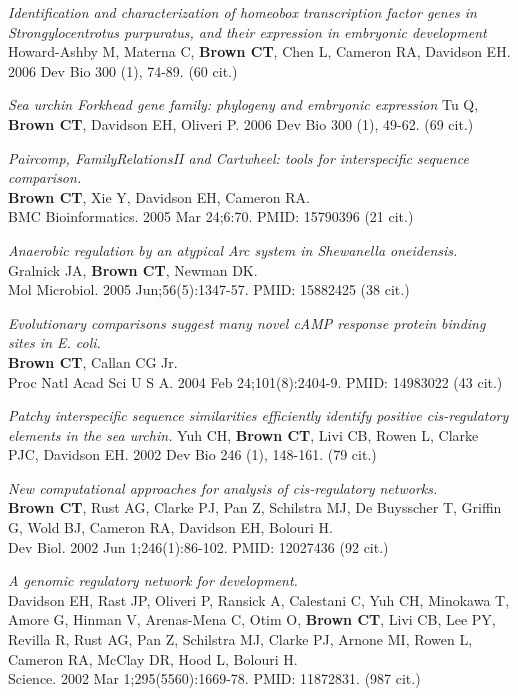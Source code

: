 \documentclass[margin,line]{resume}
\begin{document}
\begin{resume}
{\em Identification and characterization of homeobox transcription factor genes in Strongylocentrotus purpuratus, and their expression in embryonic development}
Howard-Ashby M, Materna C, {\bf Brown CT}, Chen L, Cameron RA, Davidson EH.
2006 Dev Bio 300 (1), 74-89.  (60 cit.)

{\em Sea urchin Forkhead gene family: phylogeny and embryonic expression}
Tu Q, {\bf Brown CT}, Davidson EH, Oliveri P.
2006 Dev Bio 300 (1), 49-62. (69 cit.)

{\em Paircomp, FamilyRelationsII and Cartwheel: tools for interspecific sequence comparison.}\\
{\bf Brown CT}, Xie Y, Davidson EH, Cameron RA.\\
BMC Bioinformatics. 2005 Mar 24;6:70.
PMID: 15790396 (21 cit.)

{\em Anaerobic regulation by an
atypical Arc system in {\em Shewanella oneidensis}.}\\
Gralnick JA, {\bf Brown CT}, Newman DK.\\
Mol Microbiol. 2005
Jun;56(5):1347-57.  PMID: 15882425 (38 cit.)

{\em Evolutionary comparisons suggest
many novel cAMP response protein binding sites in {\em E. coli}.}\\
{\bf Brown CT}, Callan CG Jr.\\
Proc Natl Acad Sci U S A. 2004 Feb 24;101(8):2404-9.  PMID: 14983022 (43 cit.)

{\em Patchy interspecific sequence similarities efficiently identify positive cis-regulatory elements in the sea urchin.}
Yuh CH, {\bf Brown CT}, Livi CB, Rowen L, Clarke PJC, Davidson EH.
2002 Dev Bio 246 (1), 148-161. (79 cit.)

  {\em New
computational approaches for analysis of {\em cis}-regulatory networks.}  \\
{\bf Brown CT}, Rust AG, Clarke PJ, Pan Z, Schilstra MJ, De Buysscher
T, Griffin G, Wold BJ, Cameron RA, Davidson EH, Bolouri H.\\
Dev Biol. 2002 Jun 1;246(1):86-102.  PMID: 12027436 (92 cit.)

{\em A genomic
regulatory network for development.}\\
Davidson EH, Rast JP, Oliveri P, Ransick A, Calestani C, Yuh CH,
Minokawa T, Amore G, Hinman V, Arenas-Mena C, Otim O, {\bf Brown CT}, Livi
CB, Lee PY, Revilla R, Rust AG, Pan Z, Schilstra MJ, Clarke PJ, Arnone
MI, Rowen L, Cameron RA, McClay DR, Hood L, Bolouri H.
\\Science. 2002 Mar
1;295(5560):1669-78.  PMID: 11872831. (987 cit.)


\end{resume}
\end{document}
